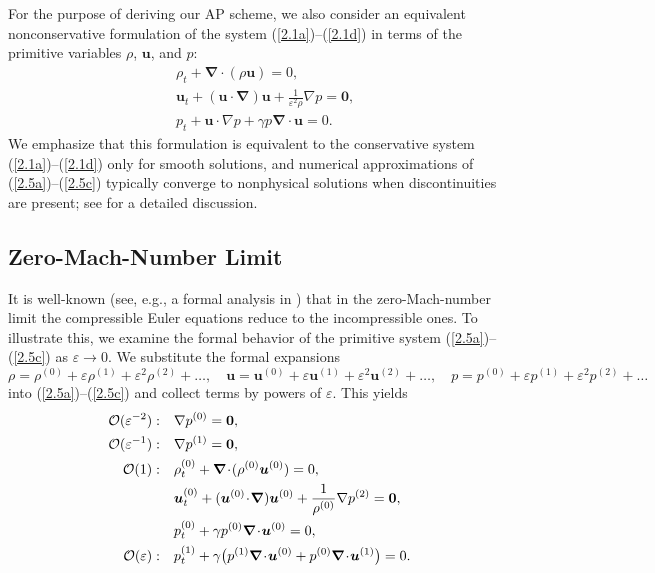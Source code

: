 \documentclass[preprint,12pt]{elsarticle}
\def\bnabla{\bm{\nabla}}
\newcommand{\ve}{\varepsilon}
\newcommand\eref[1]{(\ref{#1})}
\newcommand{\uvec}[2][3]{\boldsymbol{#2\mkern-#1mu}\mkern#1mu}
\begin{document}
For the purpose of deriving our AP scheme, we also consider an equivalent nonconservative formulation of the system \eref{2.1a}--\eref{2.1d}
in terms of the primitive variables $\rho$, $\bm u$, and $p$:
\begin{align}
	&\rho_t+\bnabla\!\cdot\!(\rho\bm u)=0,\label{2.5a}\\
	&\bm u_t+(\bm u\!\cdot\!\bnabla)\bm u+\frac{1}{\ve^2\rho}\nabla p=\bm0,\label{2.5b}\\
	&p_t+\bm u\!\cdot\!\nabla p+\gamma p\bnabla\!\cdot\!\bm u=0.\label{2.5c}
\end{align}
We emphasize that this formulation is equivalent to the conservative system \eref{2.1a}--\eref{2.1d} only for smooth solutions, and
numerical approximations of \eref{2.5a}--\eref{2.5c} typically converge to nonphysical solutions when discontinuities are present; see 
\cite{abgrall2010comment,HouLeF} for a detailed discussion.


\subsection{Zero-Mach-Number Limit}\label{sec22}
It is well-known (see, e.g., a formal analysis in \cite{Ala,MetSch}) that in the zero-Mach-number limit the compressible Euler equations
reduce to the incompressible ones. To illustrate this, we examine the formal behavior of the primitive system \eref{2.5a}--\eref{2.5c} as
$\ve\to0$. We substitute the formal expansions
\begin{equation*}
	\rho=\rho^{(0)}+\ve\rho^{(1)}+\ve^2\rho^{(2)}+\dots,\quad\bm u=\bm u^{(0)}+\ve\bm u^{(1)}+\ve^2\bm u^{(2)}+\dots,\quad
	p=p^{(0)}+\ve p^{(1)}+\ve^2p^{(2)}+\dots
\end{equation*}
into \eref{2.5a}--\eref{2.5c} and collect terms by powers of $\ve$. This yields
\begin{align}
	{\cal O}(\ve^{-2}):\quad&\nabla p^{(0)}=\uvec{0},\label{2.8f}\\
	{\cal O}(\ve^{-1}):\quad&\nabla p^{(1)}=\uvec{0},\label{2.9f}\\
	{\cal O}(1):\quad&\rho^{(0)}_t+\bnabla\!\cdot\!(\rho^{(0)}\bm u^{(0)})=0,\label{2.10f}\\
	&\bm u^{(0)}_t+(\bm u^{(0)}\!\cdot\!\bnabla)\bm u^{(0)}+\frac{1}{\rho^{(0)}}\nabla p^{(2)}=\bm0,\label{2.11f}\\
	&p^{(0)}_t+\gamma p^{(0)}\bnabla\!\cdot\!\bm u^{(0)}=0,\label{2.12f}\\
	{\cal O}(\ve):\quad&p^{(1)}_t+\gamma\big(p^{(1)}\bnabla\!\cdot\!\bm u^{(0)}+p^{(0)}\bnabla\!\cdot\!\bm u^{(1)}\big)=0.\label{2.13f}
\end{align}
\end{document}
